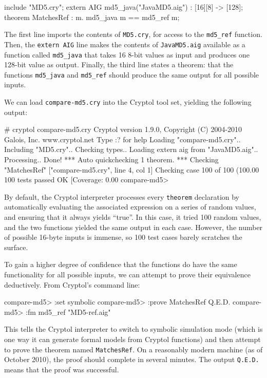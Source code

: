 \documentclass[11pt]{article}
\begin{document}
\begin{code}
include "MD5.cry";
extern AIG md5_java("JavaMD5.aig") : [16][8] -> [128];
theorem MatchesRef : {m}. md5_java m == md5_ref m;
\end{code}

The first line imports the contents of \texttt{MD5.cry}, for access to
the \texttt{md5\_ref} function. Then, the \texttt{extern AIG} line
makes the contents of \texttt{JavaMD5.aig} available as a function
called \texttt{md5\_java} that takes 16 8-bit values as input and
produces one 128-bit value as output. Finally, the third line states a
theorem: that the functions \texttt{md5\_java} and \texttt{md5\_ref}
should produce the same output for all possible inputs.

We can load \texttt{compare-md5.cry} into the Cryptol tool set,
yielding the following output:

\begin{code}
# cryptol compare-md5.cry
Cryptol version 1.9.0, Copyright (C) 2004-2010 Galois, Inc.
                                           www.cryptol.net 
Type :? for help
Loading "compare-md5.cry"..
  Including "MD5.cry".. Checking types..
  Loading extern aig from "JavaMD5.aig".. Processing.. Done!
*** Auto quickchecking 1 theorem.
*** Checking "MatchesRef" ["compare-md5.cry", line 4, col 1]
Checking case 100 of 100 (100.00%
100 tests passed OK
[Coverage: 0.00%
compare-md5> 
\end{code}

By default, the Cryptol interpreter processes every \texttt{theorem}
declaration by automatically evaluating the associated expression on a
series of random values, and ensuring that it always yields ``true''.
In this case, it tried 100 random values, and the two functions
yielded the same output in each case. However, the number of possible
16-byte inputs is immense, so 100 test cases barely scratches the
surface.

To gain a higher degree of confidence that the functions do have the
same functionality for all possible inputs, we can attempt to prove
their equivalence deductively. From Cryptol's command line:

\begin{code}
compare-md5> :set symbolic
compare-md5> :prove MatchesRef
Q.E.D.
compare-md5> :fm md5_ref "MD5-ref.aig"
\end{code}

This tells the Cryptol interpreter to switch to symbolic simulation
mode (which is one way it can generate formal models from Cryptol
functions) and then attempt to prove the theorem named
\texttt{MatchesRef}. On a reasonably modern machine (as of October
2010), the proof should complete in several minutes. The output
\texttt{Q.E.D.} means that the proof was successful.
\end{document}
